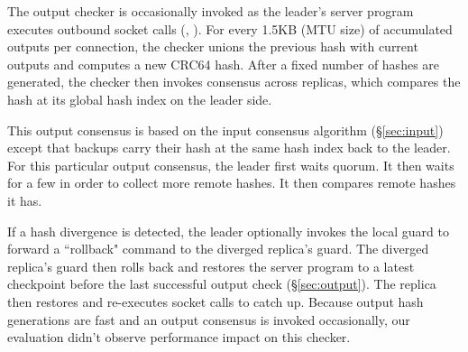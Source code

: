 


The output checker is occasionally invoked as the leader's server program 
executes outbound socket calls (\eg, \send). For every 1.5KB (MTU size) of 
accumulated outputs per connection, the checker unions the previous hash with 
current outputs and computes a new CRC64 hash. After a fixed number of hashes 
are generated, the checker then invokes consensus across replicas, which 
compares the hash at its global hash index on the leader side.

This output consensus is based on the input consensus algorithm 
(\S\ref{sec:input}) except that backups carry their hash at the same hash index 
back to the leader. For this particular output consensus, the leader first 
waits quorum. It then waits for a few \us in order to collect more remote 
hashes. It then compares remote hashes it has.

If a hash divergence is detected, the leader optionally invokes the local guard 
to forward a ``rollback" command to the diverged replica's guard. The diverged 
replica's guard then rolls back and restores the server program to a latest 
checkpoint before the last successful output check (\S\ref{sec:output}). The 
replica then restores and re-executes socket calls to catch up. Because output 
hash generations are fast and an output consensus is invoked occasionally, our 
evaluation didn't observe performance impact on this checker.



